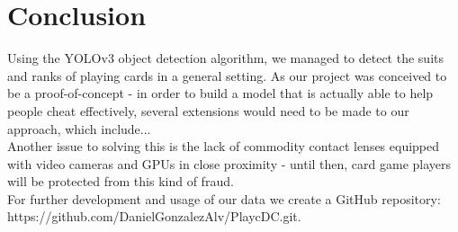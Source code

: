 \documentclass[a4paper]{article}
\begin{document}
\section{Conclusion}
Using the YOLOv3 object detection algorithm, we managed to detect the suits and ranks of playing cards in a general setting. As our project was conceived to be a proof-of-concept - in order to build a model that is actually able to help people cheat effectively, several extensions would need to be made to our approach, which include... \\ Another issue to solving this is the lack of commodity contact lenses equipped with video cameras and GPUs in close proximity - until then, card game players will be protected from this kind of fraud.
\\ For further development and usage of our data we create a GitHub repository: \\https://github.com/DanielGonzalezAlv/PlaycDC.git.

\newpage
 


\end{document}
